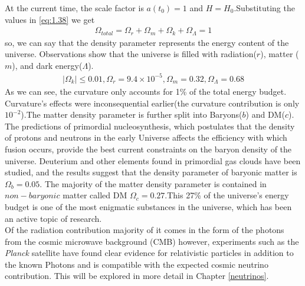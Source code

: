 At the current time, the scale factor is $a(t_0) = 1$ and $H =H_0$.Substituting the values in \eqref{eq:1.38} we get
\begin{align}
    \Omega_{total} = \Omega_{r} + \Omega_{m} + \Omega_{k} +\Omega_{\Lambda} = 1 \label{1.39}
\end{align}
so, we can say that the density parameter represents the energy content of the universe. Observations show that the universe is filled with radiation($r$), matter ($m$), and dark energy($\Lambda$).
\begin{align}
    |\Omega_k| \leq 0.01 , \Omega_r = 9.4 \times 10^{-5} , \Omega_m = 0.32 , \Omega_{\Lambda} =0.68 \label{1.40}
\end{align}
As we can see, the curvature only accounts for 1\% of the total energy budget. Curvature's effects were inconsequential earlier(the curvature contribution is only $10^{-2}$).The matter density parameter is further split into Baryons($b$) and DM($c$).\\
\hspace{0.5cm}The predictions of primordial nucleosynthesis, which postulates that the density of protons and neutrons in the early Universe affects the efficiency with which fusion occurs, provide the best current constraints on the baryon density of the universe. Deuterium and other elements found in primordial gas clouds have been studied, and the results suggest that the density parameter of baryonic matter is $\Omega_{b} = 0.05$. 
The majority of the matter density parameter is contained in $non-baryonic$ matter called DM $\Omega_{c} = 0.27$.This 27\% of the universe's energy budget is one of the most enigmatic substances in the universe, which has been an active topic of research.\\
\hspace{0.5cm} Of the radiation contribution majority of it comes in the form of the photons from the cosmic microwave background (CMB) however, experiments such as the \emph{Planck} satellite have found clear evidence for relativistic particles in addition to the known Photons and is compatible with the expected cosmic neutrino contribution\cite{planckcollaboration2019planck2018resultsix}. This will be explored in more detail in Chapter \ref{neutrinos}.
\hspace{0.5cm} 





